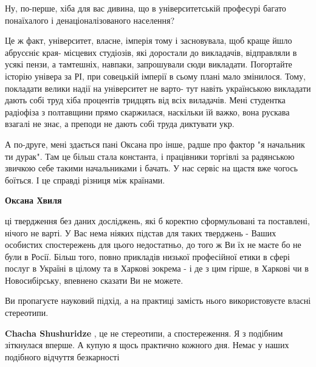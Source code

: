 \begin{itemize}
\begin{itemize}
Ну, по-перше, хіба для вас дивина, що в університетській професурі багато
понаїхалого і денаціоналізованого населення?

Це ж факт, університет, власне, імперія тому і засновувала, щоб краще йшло
абрусєніє края- місцевих студіозів, які доростали до викладачів, відправляли в
усякі пензи, а тамтешніх, навпаки, запрошували сюди викладати. Погортайте
історію універа за РІ, при совецькій імперії в сьому плані мало змінилося.
Тому, покладати велики надії на університет не варто- тут навіть українською
викладати дають собі труд хіба процентів тридцять від всіх виладачів. Мені
студентка радіофіза з полтавщини прямо скаржилася, наскільки їй важко, вона
рускава взагалі не знає, а преподи не дають собі труда диктувати укр.

А по-друге, мені здається пані Оксана про інше, радше про фактор "я начальник
ти дурак". Там це більш стала константа, і працівники торгівлі за радянською
звичкою себе такими начальниками і бачать. У нас сервіс на щастя вже чогось
боїться. І це справді різниця між країнами.

 
\textbf{Оксана Хвиля} 

ці твердження без даних досліджень, які б коректно сформульовані та поставлені,
нічого не варті. У Вас нема ніяких підстав для таких тверджень - Ваших
особистих спостережень для цього недостатньо, до того ж Ви їх не маєте бо не
були в Росії. Більш того, повно прикладів низької професійної етики в сфері
послуг в Україні в цілому та в Харкові зокрема - і де з цим гірше, в Харкові чи
в Новосибірську, впевнено сказати Ви не можете.

Ви пропагуєте науковий підхід, а на практиці замість нього використовуєте
власні стереотипи.


 
\textbf{Chacha Shushuridze} , це не стереотипи, а спостереження. Я з подібним
зіткнулася вперше. А купую я щось практично кожного дня. Немає у наших
подібного відчуття безкарності


\end{itemize}
\end{itemize}
